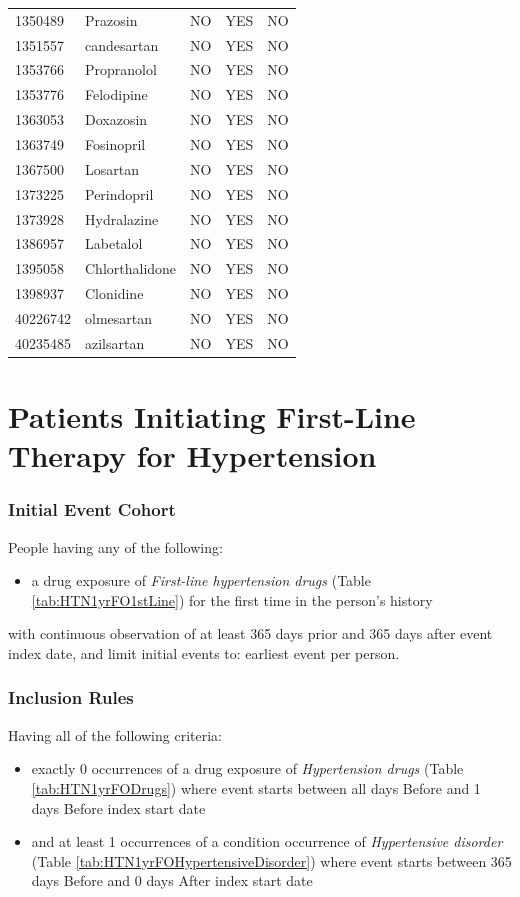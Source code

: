 \documentclass[10.5pt]{book}
\providecommand{\tightlist}{%
  \setlength{\itemsep}{0pt}\setlength{\parskip}{0pt}}
\theoremstyle{definition}
\theoremstyle{definition}
\theoremstyle{definition}
\theoremstyle{remark}
\begin{document}
\begin{longtable}[]{@{}lllll@{}}
1350489 & Prazosin & NO & YES & NO\tabularnewline
1351557 & candesartan & NO & YES & NO\tabularnewline
1353766 & Propranolol & NO & YES & NO\tabularnewline
1353776 & Felodipine & NO & YES & NO\tabularnewline
1363053 & Doxazosin & NO & YES & NO\tabularnewline
1363749 & Fosinopril & NO & YES & NO\tabularnewline
1367500 & Losartan & NO & YES & NO\tabularnewline
1373225 & Perindopril & NO & YES & NO\tabularnewline
1373928 & Hydralazine & NO & YES & NO\tabularnewline
1386957 & Labetalol & NO & YES & NO\tabularnewline
1395058 & Chlorthalidone & NO & YES & NO\tabularnewline
1398937 & Clonidine & NO & YES & NO\tabularnewline
40226742 & olmesartan & NO & YES & NO\tabularnewline
40235485 & azilsartan & NO & YES & NO\tabularnewline
\bottomrule
\end{longtable}

\section{Patients Initiating First-Line Therapy for
Hypertension}\label{HTN1yrFO}

\subsubsection*{Initial Event Cohort}\label{initial-event-cohort-5}

People having any of the following:

\begin{itemize}
\tightlist
\item
  a drug exposure of \emph{First-line hypertension drugs} (Table
  \ref{tab:HTN1yrFO1stLine}) for the first time in the person's history
\end{itemize}

with continuous observation of at least 365 days prior and 365 days
after event index date, and limit initial events to: earliest event per
person.

\subsubsection*{Inclusion Rules}\label{inclusion-rules-2}

Having all of the following criteria:

\begin{itemize}
\tightlist
\item
  exactly 0 occurrences of a drug exposure of \emph{Hypertension drugs}
  (Table \ref{tab:HTN1yrFODrugs}) where event starts between all days
  Before and 1 days Before index start date
\item
  and at least 1 occurrences of a condition occurrence of
  \emph{Hypertensive disorder} (Table
  \ref{tab:HTN1yrFOHypertensiveDisorder}) where event starts between 365
  days Before and 0 days After index start date
\end{itemize}
\end{document}
